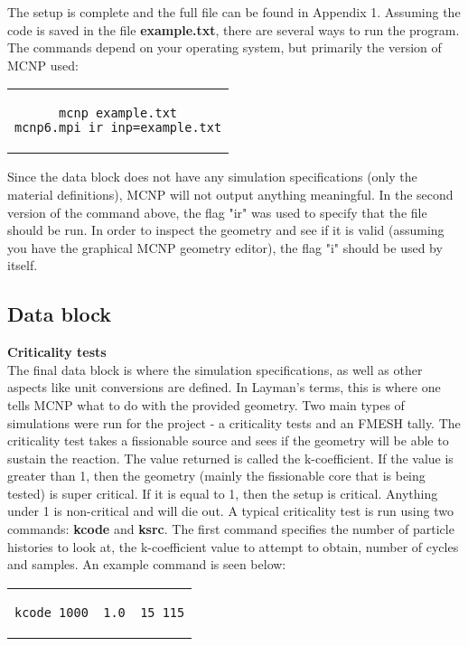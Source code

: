 The setup is complete and the full file can be found in Appendix 1. Assuming the code is saved in the file \textbf{example.txt}, there are several ways to run the program. The commands depend on your operating system, but primarily the version of MCNP used:

\begin{center}
\begin{tabular}{c}
\begin{lstlisting}
mcnp example.txt
mcnp6.mpi ir inp=example.txt
\end{lstlisting}
\end{tabular}
\end{center}

Since the data block does not have any simulation specifications (only the material definitions), MCNP will not output anything meaningful. In the second version of the command above, the flag "ir" was used to specify that the file should be run. In order to inspect the geometry and see if it is valid (assuming you have the graphical MCNP geometry editor), the flag "i" should be used by itself.

\label{sec:simulations}
\subsection{Data block}

\textbf{Criticality tests}\\

The final data block is where the simulation specifications, as well as other aspects like unit conversions are defined. In Layman's terms, this is where one tells MCNP what to do with the provided geometry. Two main types of simulations were run for the project - a criticality tests and an FMESH tally. The criticality test takes a fissionable source and sees if the geometry will be able to sustain the reaction. The value returned is called the k-coefficient. If the value is greater than 1, then the geometry (mainly the fissionable core that is being tested) is super critical. If it is equal to 1, then the setup is critical. Anything under 1 is non-critical and will die out. A typical criticality test is run using two commands: \textbf{kcode} and \textbf{ksrc}. The first command specifies the number of particle histories to look at, the k-coefficient value to attempt to obtain, number of cycles and samples. An example command is seen below:

\begin{center}
\begin{tabular}{c}
\begin{lstlisting}
kcode 1000  1.0  15 115
\end{lstlisting}
\end{tabular}
\end{center}

